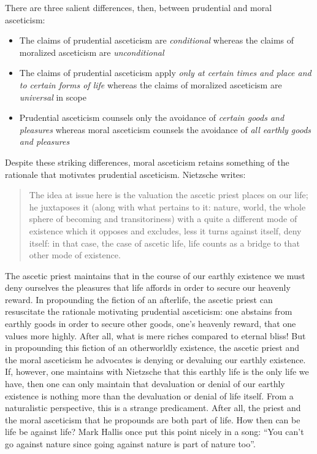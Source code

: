 There are three salient differences, then, between prudential and moral asceticism:
\begin{itemize}
    \item The claims of prudential asceticism are \emph{conditional} whereas the claims of moralized asceticism are \emph{unconditional}
    \item The claims of prudential asceticism apply \emph{only at certain times and place and to certain forms of life} whereas the claims of moralized asceticism are \emph{universal} in scope
    \item Prudential asceticism counsels only the avoidance of \emph{certain goods and pleasures} whereas moral asceticism counsels the avoidance of \emph{all earthly goods and pleasures}
\end{itemize}

Despite these striking differences, moral asceticism retains something of the rationale that motivates prudential asceticism. Nietzsche writes:
\begin{quote}
    The idea at issue here is the valuation the ascetic priest places on our life; he juxtaposes it (along with what pertains to it: nature, world, the whole sphere of becoming and transitoriness) with a quite a different mode of existence which it opposes and excludes, less it turns against itself, deny itself: in that case, the case of ascetic life, life counts as a bridge to that other mode of existence.
\end{quote}
The ascetic priest maintains that in the course of our earthly existence we must deny ourselves the pleasures that life affords in order to secure our heavenly reward. In propounding the fiction of an afterlife, the ascetic priest can resuscitate the rationale motivating prudential asceticism: one abstains from earthly goods in order to secure other goods, one's heavenly reward, that one values more highly. After all, what is mere riches compared to eternal bliss! But in propounding this fiction of an otherworldly existence, the ascetic priest and the moral asceticism he advocates is denying or devaluing our earthly existence. If, however, one maintains with Nietzsche that this earthly life is the only life we have, then one can only maintain that devaluation or denial of our earthly existence is nothing more than the devaluation or denial of life itself. From a naturalistic perspective, this is a strange predicament. After all, the priest and the moral asceticism that he propounds are both part of life. How then can be life be against life? Mark Hallis once put this point nicely in a song: ``You can't go against nature since going against nature is part of nature too''.

